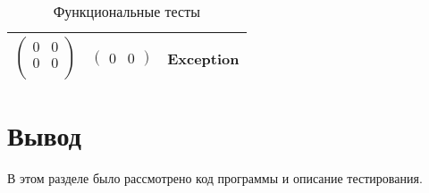 \begin{table}[h]
\begin{tabular}{|c|c|c|}
        $\begin{pmatrix} 0 & 0 \\ 0 & 0 \\ \end{pmatrix}$
        &
        $\begin{pmatrix} 0 & 0 \end{pmatrix}$
        &
        Exception
        \\\hline
    \end{tabular}
    \caption{\label{tabular:func_test} Функциональные тесты}
\end{table}

\section{Вывод}

В этом разделе было рассмотрено код программы и описание тестирования.